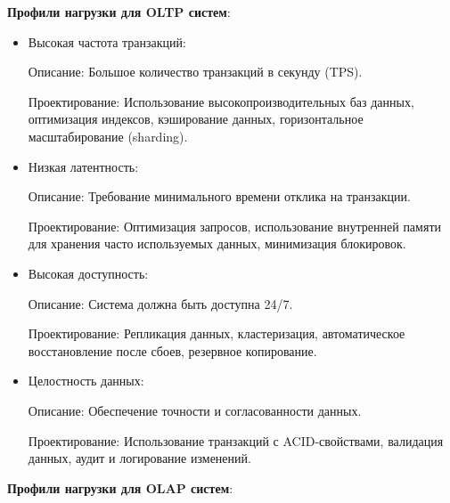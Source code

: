\textbf{Профили нагрузки для OLTP систем}:
\begin{itemize}
	\item Высокая частота транзакций:

	Описание: Большое количество транзакций в секунду (TPS).

	Проектирование: Использование высокопроизводительных баз данных, оптимизация индексов, кэширование данных, горизонтальное масштабирование (sharding).

	\item Низкая латентность:

	Описание: Требование минимального времени отклика на транзакции.
	
	Проектирование: Оптимизация запросов, использование внутренней памяти для хранения часто используемых данных, минимизация блокировок.
	
	\item Высокая доступность:

	Описание: Система должна быть доступна 24/7.
	
	Проектирование: Репликация данных, кластеризация, автоматическое восстановление после сбоев, резервное копирование.
	
	\item Целостность данных:

	Описание: Обеспечение точности и согласованности данных.
	
	Проектирование: Использование транзакций с ACID-свойствами, валидация данных, аудит и логирование изменений.
\end{itemize}

\textbf{Профили нагрузки для OLAP систем}:

